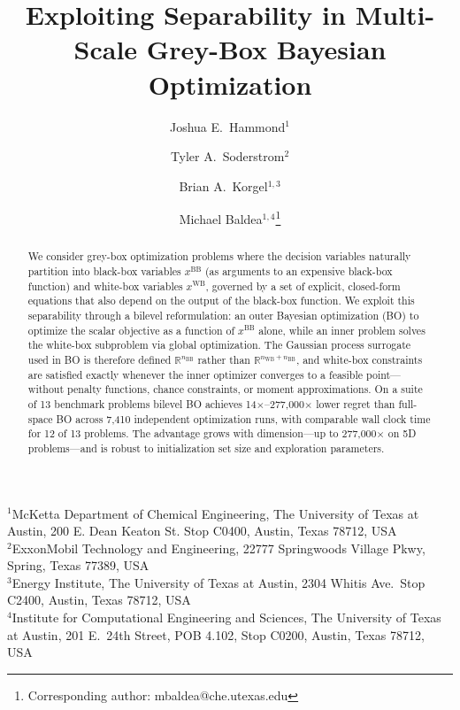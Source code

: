 \documentclass[12pt,a4paper]{article}%
\theoremstyle{plain}%
\theoremstyle{remark}%
\theoremstyle{definition}%
\def\WB{\mathrm{WB}}
\def\BB{\mathrm{BB}}
\begin{document}
\title{Exploiting Separability in Multi-Scale Grey-Box Bayesian Optimization}

\author{Joshua E.\ Hammond$^{1}$ \and Tyler A.\ Soderstrom$^{2}$ \and Brian A.\ Korgel$^{1,3}$ \and Michael Baldea$^{1,4}$\thanks{Corresponding author: mbaldea@che.utexas.edu}}

\date{}

\maketitle

\noindent$^{1}$McKetta Department of Chemical Engineering, The University of Texas at Austin, 200 E. Dean Keaton St. Stop C0400, Austin, Texas 78712, USA\\
$^{2}$ExxonMobil Technology and Engineering, 22777 Springwoods Village Pkwy, Spring, Texas 77389, USA\\
$^{3}$Energy Institute, The University of Texas at Austin, 2304 Whitis Ave.\ Stop C2400, Austin, Texas 78712, USA\\
$^{4}$Institute for Computational Engineering and Sciences, The University of Texas at Austin, 201 E.\ 24th Street, POB 4.102, Stop C0200, Austin, Texas 78712, USA

\bigskip

\begin{abstract}
We consider grey-box optimization problems where the decision variables naturally partition into black-box variables $x^{\BB}$ (as arguments to an expensive black-box function) and white-box variables $x^{\WB}$, governed by a set of explicit, closed-form equations that also depend on the output of the black-box function. We exploit this separability through a bilevel reformulation: an outer Bayesian optimization (BO) to optimize the scalar objective as a function of $x^{\BB}$ alone, while an inner problem solves the white-box subproblem via global optimization. The Gaussian process surrogate used in BO is therefore defined $\mathbb{R}^{n_{\BB}}$ rather than $\mathbb{R}^{n_{\WB}+n_{\BB}}$, and white-box constraints are satisfied exactly whenever the inner optimizer converges to a feasible point---without penalty functions, chance constraints, or moment approximations. On a suite of 13 benchmark problems bilevel BO achieves 14$\times$--277{,}000$\times$ lower regret than full-space BO across 7{,}410 independent optimization runs, with comparable wall clock time for 12 of 13 problems. The advantage grows with dimension---up to 277{,}000$\times$ on 5D problems---and is robust to initialization set size and exploration parameters.
\end{abstract}
\end{document}
